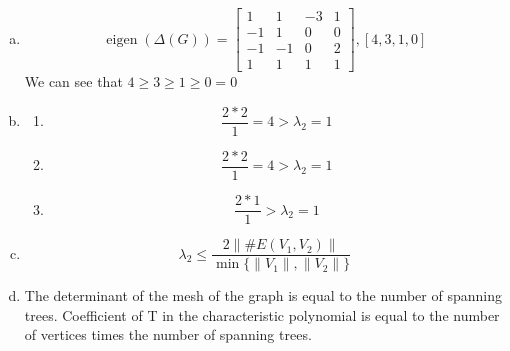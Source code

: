 \documentclass[12pt]{article}
\begin{document}
\section{} %
\begin{enumerate}[(a)]
	\item 
		\[\operatorname{eigen}(\Delta(G)) = 
		\begin{bmatrix}
			1  & 1  & -3 & 1 \\
			-1 & 1  & 0  & 0 \\
			-1 & -1 & 0  & 2 \\
			1  & 1  & 1  & 1
		\end{bmatrix},
		[4,3,1,0]
		\]
		We can see that $ 4 \geq 3 \geq 1 \ge 0 = 0 $
		
	\item 
		\begin{enumerate}[a]
			\item \[\dfrac{2 * 2}{1} = 4 > \lambda_2 = 1\]
				
			\item \[\dfrac{2 * 2}{1} = 4 > \lambda_2 = 1\]
			
			\item \[\dfrac{2*1}{1} > \lambda_2 = 1\]
		\end{enumerate}
	
	\item \[\lambda_2 \leq \dfrac{2\|\#E(V_1, V_2)\|}{\operatorname{min}\{\|V_1\|, \|V_2\|\}}\]
	
	\item The determinant of the mesh of the graph is equal to the number of spanning trees. Coefficient of T in the characteristic polynomial is equal to the number of vertices times the number of spanning trees.
\end{enumerate}

\newpage
\end{document}
